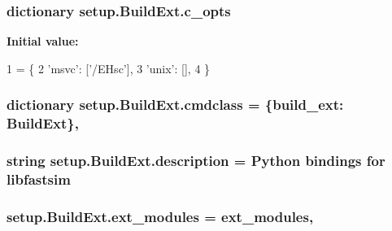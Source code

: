 \subsubsection[{\texorpdfstring{c\+\_\+opts}{c_opts}}]{\setlength{\rightskip}{0pt plus 5cm}dictionary setup.\+Build\+Ext.\+c\+\_\+opts\hspace{0.3cm}{\ttfamily [static]}}\hypertarget{classsetup_1_1_build_ext_ad923dda6f6197eacc466b0def10d3297}{}\label{classsetup_1_1_build_ext_ad923dda6f6197eacc466b0def10d3297}
{\bfseries Initial value\+:}
\begin{DoxyCode}
1 = \{
2         \textcolor{stringliteral}{'msvc'}: [\textcolor{stringliteral}{'/EHsc'}],
3         \textcolor{stringliteral}{'unix'}: [],
4     \}
\end{DoxyCode}
\subsubsection[{\texorpdfstring{cmdclass}{cmdclass}}]{\setlength{\rightskip}{0pt plus 5cm}dictionary setup.\+Build\+Ext.\+cmdclass = \{\textquotesingle{}build\+\_\+ext\textquotesingle{}\+: {\bf Build\+Ext}\},\hspace{0.3cm}{\ttfamily [static]}}\hypertarget{classsetup_1_1_build_ext_a331bbe264b05f2da56fa133ece4b5ee0}{}\label{classsetup_1_1_build_ext_a331bbe264b05f2da56fa133ece4b5ee0}
\subsubsection[{\texorpdfstring{description}{description}}]{\setlength{\rightskip}{0pt plus 5cm}string setup.\+Build\+Ext.\+description = \textquotesingle{}Python bindings for libfastsim\textquotesingle{}\hspace{0.3cm}{\ttfamily [static]}}\hypertarget{classsetup_1_1_build_ext_a4ddc07d45d333fc55922d5f840e1c102}{}\label{classsetup_1_1_build_ext_a4ddc07d45d333fc55922d5f840e1c102}
\subsubsection[{\texorpdfstring{ext\+\_\+modules}{ext_modules}}]{\setlength{\rightskip}{0pt plus 5cm}setup.\+Build\+Ext.\+ext\+\_\+modules = ext\+\_\+modules,\hspace{0.3cm}{\ttfamily [static]}}\hypertarget{classsetup_1_1_build_ext_ade2fbdb58cb8589f4200ccc45ae698b5}{}\label{classsetup_1_1_build_ext_ade2fbdb58cb8589f4200ccc45ae698b5}

